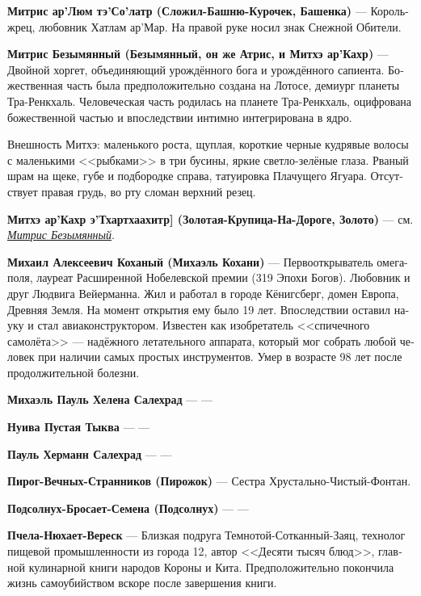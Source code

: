 \documentclass[a4paper,12pt,fleqn]{book}\usepackage{cooltooltips}\usepackage{polyglossia}\setdefaultlanguage[babelshorthands=true]{russian}\setotherlanguage{english}\defaultfontfeatures{Ligatures=TeX,Mapping=tex-text} \usepackage{xcolor}\definecolor{lightgray}{HTML}{bbbbbb}\color{lightgray}\newcommand{\ml}[3]{\textenglish{\textcolor{black}{#3}}}
\newcommand{\theterm}[3]{\textbf{\hypertarget{#1}{#2}} --- #3}
\newcommand{\thesynonim}[3]{\textbf{#2} --- см. \textit{\hyperlink{#1}{#3}}.}
\begin{document}
{\theterm{king-priest-mitris}
{Митрис ар’Люм тэ’Со'латр (Сложил-Башню-Курочек, Башенка)}
{Король-жрец, любовник Хатлам ар'Мар.
На правой руке носил знак Снежной Обители.}

\theterm{nameless} %
{Митрис Безымянный (Безымянный, он же Атрис, и Митхэ ар'Кахр)}
{Двойной хоргет, объединяющий урождённого бога и урождённого сапиента.
Божественная часть была предположительно создана на Лотосе, демиург планеты Тра-Ренкхаль.
Человеческая часть родилась на планете Тра-Ренкхаль, оцифрована божественной частью и впоследствии интимно интегрирована в ядро.

Внешность Митхэ: маленького роста, щуплая, короткие черные кудрявые волосы с маленькими <<рыбками>> в три бусины, яркие светло-зелёные глаза.
Рваный шрам на щеке, губе и подбородке справа, татуировка Плачущего Ягуара.
Отсутствует правая грудь, во рту сломан верхний резец.}

\thesynonim{nameless}
{Митхэ ар’Кахр э’Тхартхаахитр] (Золотая-Крупица-На-Дороге, Золото)}
{Митрис Безымянный}

\theterm{kojani}
{Михаил Алексеевич Коханый (Михаэль Кохани)}
{Первооткрыватель омега-поля, лауреат Расширенной Нобелевской премии (319 Эпохи Богов).
Любовник и друг Людвига Вейерманна.
Жил и работал в городе Кёнигсберг, домен Европа, Древняя Земля.
На момент открытия ему было 19 лет.
Впоследствии оставил науку и стал авиаконструктором.
Известен как изобретатель <<спичечного самолёта>> --- надёжного летательного аппарата, который мог собрать любой человек при наличии самых простых инструментов.
Умер в возрасте 98 лет после продолжительной болезни.}

\theterm{michael}
{Михаэль Пауль Хелена Салехрад}
{---}

\theterm{nuuwa} %
{Нуива Пустая Тыква}
{---}

\theterm{paul}
{Пауль Херманн Салехрад}
{---}

\theterm{cupcake}
{Пирог-Вечных-Странников (Пирожок)}
{Сестра Хрустально-Чистый-Фонтан.}

\theterm{sunflower} %
{Подсолнух-Бросает-Семена (Подсолнух)}
{---}

\theterm{heather} %
{Пчела-Нюхает-Вереск}
{Близкая подруга Темнотой-Сотканный-Заяц, технолог пищевой промышленности из города 12, автор <<Десяти тысяч блюд>>, главной кулинарной книги народов Короны и Кита.
Предположительно покончила жизнь самоубийством вскоре после завершения книги.}

}
\end{document}
